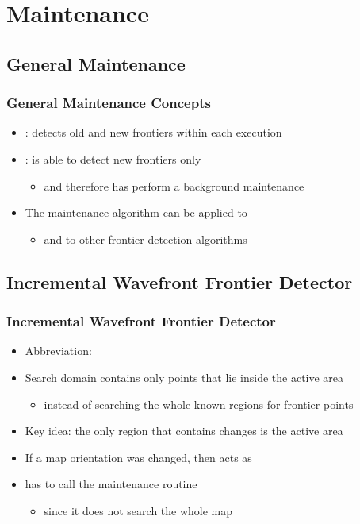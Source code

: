 \section{Maintenance}
\subsection*{General Maintenance}
\begin{frame}
\frametitle{General Maintenance Concepts}
\begin{itemize}
  \item \WFD: detects old and new frontiers within each execution
  \item \FFD: is able to detect new frontiers only
  \begin{itemize}
    \item and therefore has perform a background maintenance
  \end{itemize}
  \item The maintenance algorithm can be applied to \WFD
  	\begin{itemize}
  	  \item and to other frontier detection algorithms
  	\end{itemize}
\end{itemize}
\end{frame}

\subsection*{Incremental Wavefront Frontier Detector}
\begin{frame}
\frametitle{Incremental Wavefront Frontier Detector}
\begin{itemize}
  \item Abbreviation: \WFDINC
  \item Search domain contains only points that lie inside the active area
  	\begin{itemize}
  	  \item instead of searching the whole known regions for frontier points
  	\end{itemize}
  \item Key idea: the only region that contains changes is the active area
  \item If a map orientation was changed, then \WFDINC acts as \WFD
  \item \WFDINC has to call the maintenance routine
  \begin{itemize}
  	  \item since it does not search the whole map
  	\end{itemize}     
\end{itemize}
\end{frame}

